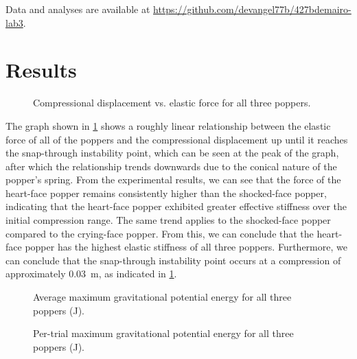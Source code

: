 \documentclass[reprint,amsmath,amssymb,aps,twoside]{revtex4-2} %
\begin{document}
Data and analyses are available at \url{https://github.com/devangel77b/427bdemairo-lab3}. 






\section{Results}

\begin{figure}
\begin{center}

\end{center}
\caption{Compressional displacement vs. elastic force for all three poppers.}
\label{fig:1}
\end{figure}

The graph shown in \cref{fig:1} shows a roughly linear relationship between the elastic force of all of the poppers and the compressional displacement up until it reaches the snap-through instability point, which can be seen at the peak of the graph, after which the relationship trends downwards due to the conical nature of the popper’s spring. From the experimental results, we can see that the force of the heart-face popper remains consistently higher than the shocked-face popper, indicating that the heart-face popper exhibited greater effective stiffness over the initial compression range. The same trend applies to the shocked-face popper compared to the crying-face popper. From this, we can conclude that the heart-face popper has the highest elastic stiffness of all three poppers. Furthermore, we can conclude that the snap-through instability point occurs at a compression of approximately \qty{0.03}{\meter}, as indicated in \cref{fig:1}.

\begin{figure}
\begin{center}

\end{center}
\caption{Average maximum gravitational potential energy for all three poppers (\unit{\joule}).}
\label{fig:2.1}
\end{figure}

\begin{figure}
\begin{center}

\end{center}
\caption{Per-trial maximum gravitational potential energy for all three poppers (\unit{\joule}).}
\label{fig:2.2}
\end{figure}
\end{document}
